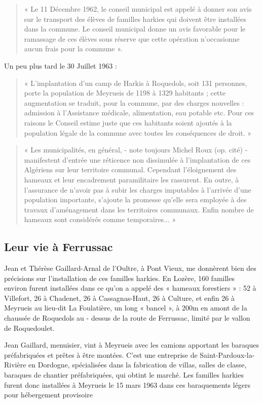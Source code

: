 \begin{quote}
« Le 11 Décembre 1962, le conseil municipal est appelé à donner son avis sur le
transport des élèves de familles harkies qui doivent être installées dans la commune.
Le conseil municipal donne un avis favorable pour le ramassage de ces élèves sous
réserve que cette opération n’occasionne aucun frais pour la commune ».
\end{quote}

Un peu plus tard le 30 Juillet 1963 :

\begin{quote}
« L’implantation d’un camp de Harkis à Roquedols, soit 131 personnes, porte la
population de Meyrueis de 1198 à 1329 habitants ; cette augmentation se traduit,
pour la commune, par des charges nouvelles : admission à l’Assistance médicale,
alimentation, eau potable etc. Pour ces raisons le Conseil estime juste que ces
habitants soient ajoutés à la population légale de la commune avec toutes les
conséquences de droit. »
\end{quote}

\begin{quote}
« Les municipalités, en général, - note toujours Michel Roux (op. cité) - manifestent
d’entrée une réticence non dissimulée à l’implantation de ces Algériens sur leur
territoire communal. Cependant l’éloignement des hameaux et leur encadrement
paramilitaire les rassurent. En outre, à l’assurance de n’avoir pas à subir les charges
imputables à l’arrivée d’une population importante, s’ajoute la promesse qu’elle sera
employée à des travaux d’aménagement dans les territoires communaux. Enfin
nombre de hameaux sont considérés comme temporaires... »
\end{quote}

\subsection{Leur vie à Ferrussac}

Jean et Thérèse Gaillard-Arnal de l’Oultre, à Pont Vieux, me donnèrent bien des
précisions sur l’installation de ces familles harkies. En Lozère, 160 familles environ
furent installées dans ce qu’on a appelé des « hameaux forestiers » : 52 à Villefort, 26
à Chadenet, 26 à Cassagnas-Haut, 26 à Culture, et enfin 26 à Meyrueis au lieu-dit La
Foulatière, un long « bancel », à 200m en amont de la chaussée de Roquedols au -
dessus de la route de Ferrussac, limité par le vallon de Roquedoulet.

Jean Gaillard, menuisier, vint à Meyrueis avec les camions apportant les baraques
préfabriquées et prêtes à être montées. C’est une entreprise de Saint-Pardoux-la-
Rivière en Dordogne, spécialisées dans la fabrication de villas, salles de classe,
baraques de chantier préfabriquées, qui obtint le marché.
Les familles harkies furent donc installées à Meyrueis le 15 mars 1963 dans ces
baraquements légers pour hébergement provisoire

